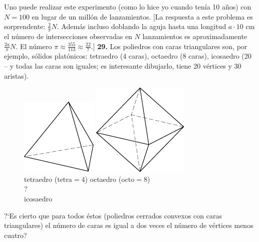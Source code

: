 \documentclass[12pt, spanish]{article}  %
\begin{document}
Uno puede realizar este experimento (como lo hice yo cuando ten\'{i}a 10 a\~nos) con $N=100$ en lugar de un mill\'on de lanzamientos.
[La respuesta a este problema es sorprendente: $\frac2{\pi}N$. Adem\'as incluso doblando la aguja hasta una longitud $a \cdot 10$
cm el n\'umero de intersecciones observadas en $N$ lanzamientos es aproximadamente $\frac{2a}{\pi}N$. 
El n\'umero $\pi \approx  \frac{355}{113} \approx \frac{22}7.$]
\newline\newline\quad
{\bf 29.} Los poliedros con caras triangulares son, por ejemplo, s\'olidos plat\'onicos: tetraedro (4 caras), octaedro (8 caras), icosaedro (20 -- y todas las caras son iguales; es interesante dibujarlo, tiene 20 v\'ertices y 30 aristas).
\begin{figure}[h!]
\centering
\footnotesize
\hspace{5pt}
\includegraphics[scale=1]{taskbook-131}\hspace{68pt}
\includegraphics[scale=1]{taskbook-132}\\ \vspace{3pt}
tetraedro (tetra${}= 4$) \hspace{40pt}
octaedro (octo${}= 8$)\\[25pt]
{\Huge 
?}\\ icosaedro\vspace{3pt}
\end{figure}
\newline\quad

?`Es cierto que para todos \'estos (poliedros cerrados convexos con caras triangulares) el n\'umero de caras es igual a dos veces el n\'umero de v\'ertices menos cuatro?
\end{document}
